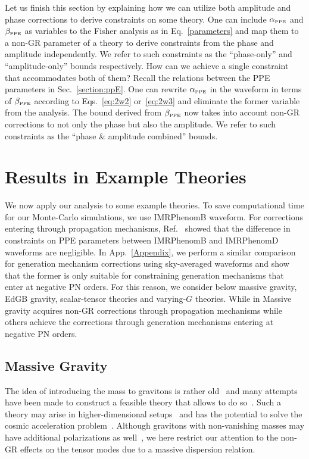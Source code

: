\documentclass[prd,twocolumn,nofootinbib]{revtex4-1}
\newcommand{\PPE}{{\mbox{\tiny PPE}}}
\begin{document}
Let us finish this section by explaining how we can utilize both amplitude and phase corrections to derive constraints on some theory. One can include $\alpha_{\PPE}$ and $\beta_{\PPE}$ as variables to the Fisher analysis as in Eq.~\eqref{parameters} and map them to a non-GR parameter of a theory to derive constraints from the phase and amplitude independently. We refer to such constraints as  the ``phase-only'' and ``amplitude-only'' bounds respectively. How can we achieve a single constraint that accommodates both of them? Recall the relations between the PPE parameters in Sec.~\ref{section:ppE}. One can rewrite $\alpha_{\PPE}$ in the waveform in terms of $\beta_{\PPE}$ according to Eqs.~\eqref{eq:2w2} or~\eqref{eq:2w3} and eliminate the former variable from the analysis. The bound derived from $\beta_{\PPE}$ now takes into account non-GR corrections to not only the phase but also the amplitude. We refer to such constraints as the ``phase \& amplitude combined'' bounds.


\section{Results in Example Theories}

We now apply our analysis to some example theories. To save computational time for our Monte-Carlo simulations, we use IMRPhenomB waveform. For corrections entering through propagation mechanisms, Ref.~\cite{Yunes:2016jcc} showed that the difference in constraints on PPE parameters between IMRPhenomB and IMRPhenomD waveforms are negligible. In App.~\ref{Appendix}, we perform a similar comparison for generation mechanism corrections using sky-averaged waveforms and show that the former is only suitable for constraining generation mechanisms that enter at negative PN orders. For this reason, we consider below massive gravity, EdGB gravity, scalar-tensor theories and varying-$G$ theories. While in Massive gravity acquires non-GR corrections through propagation mechanisms while others achieve the corrections through generation mechanisms entering at negative PN orders.



\subsection{Massive Gravity}
\label{sec:massive}
The idea of introducing the mass to gravitons is rather old~\cite{Fierz:1939ix} and many attempts have been made to construct a feasible theory that allows to do so~\cite{deRham:2014zqa}.  Such a theory may arise in higher-dimensional setups~\cite{Hinterbichler:2011tt} and has the potential to solve the cosmic acceleration problem~\cite{deRham:2014zqa}. Although gravitons with non-vanishing masses may have additional polarizations as well~\cite{dePaula:2004bc}, we here restrict our attention to the non-GR effects on the tensor modes due to a massive dispersion relation.
\end{document}
